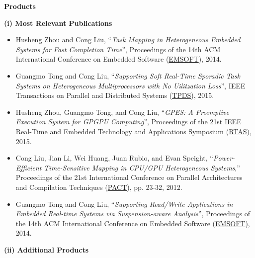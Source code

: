 \documentclass[10pt,letterpaper]{article}
\begin{document}
\noindent \textbf{Products} 

\hspace{-4mm} \textbf{(i) Most Relevant Publications}\  
	\vspace{-1mm}
	\begin{itemize}

\item 
Husheng Zhou and Cong Liu, ``\textit{Task Mapping in Heterogeneous Embedded Systems for Fast Completion Time}'', Proceedings of the 14th ACM International Conference on Embedded Software (\underline{EMSOFT}), 2014.

\item
Guangmo Tong and Cong Liu, ``\textit{Supporting Soft Real-Time Sporadic Task Systems on Heterogeneous Multiprocessors with No Uilitzation Loss}'', IEEE Transactions on Parallel and Distributed Systems (\underline{TPDS}), 2015.

	
\item
Husheng Zhou, Guangmo Tong, and Cong Liu, ``\textit{GPES: A Preemptive Execution System for GPGPU Computing}'', Proceedings of the 21st IEEE Real-Time and Embedded Technology and Applications Symposium (\underline{RTAS}), 2015.


\item  	Cong Liu, Jian Li, Wei Huang, Juan Rubio, and Evan Speight, ``\textit{Power-Efficient Time-Sensitive Mapping in CPU/GPU Heterogeneous Systems},'' Proceedings of the 21st International Conference on Parallel Architectures and Compilation Techniques (\underline{PACT}), pp. 23-32, 2012.

\item Guangmo Tong and Cong Liu, ``\textit{Supporting Read/Write Applications in Embedded Real-time Systems via Suspension-aware Analysis}'', Proceedings of the 14th ACM International Conference on Embedded Software (\underline{EMSOFT}), 2014.





\end{itemize}
\hspace{-4mm} \textbf{(ii) Additional Products}\  
\vspace{-1mm}
\end{document}
